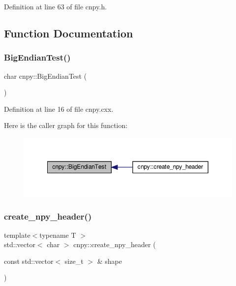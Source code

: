 Definition at line 63 of file cnpy.\+h.



\subsection{Function Documentation}
\mbox{\label{namespacecnpy_aa24638ba6b2f41429ee32e03295448cf}} 
\subsubsection{\texorpdfstring{Big\+Endian\+Test()}{BigEndianTest()}}
{\footnotesize\ttfamily char cnpy\+::\+Big\+Endian\+Test (\begin{DoxyParamCaption}{ }\end{DoxyParamCaption})}



Definition at line 16 of file cnpy.\+cxx.

Here is the caller graph for this function\+:
\nopagebreak
\begin{figure}[H]
\begin{center}
\leavevmode
\includegraphics[width=349pt]{namespacecnpy_aa24638ba6b2f41429ee32e03295448cf_icgraph}
\end{center}
\end{figure}
\mbox{\label{namespacecnpy_a9e4cd705ce96b2350ba17bfdf6f09a24}} 
\subsubsection{\texorpdfstring{create\+\_\+npy\+\_\+header()}{create\_npy\_header()}}
{\footnotesize\ttfamily template$<$typename T $>$ \\
std\+::vector$<$ char $>$ cnpy\+::create\+\_\+npy\+\_\+header (\begin{DoxyParamCaption}\item[{const std\+::vector$<$ size\+\_\+t $>$ \&}]{shape }\end{DoxyParamCaption})}



